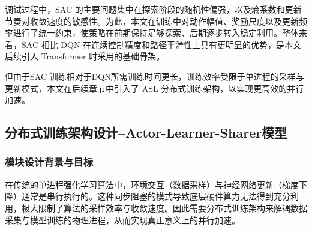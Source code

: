 调试过程中，SAC 的主要问题集中在探索阶段的随机性偏强，以及熵系数和更新节奏对收敛速度的敏感性。为此，本文在训练中对动作幅值、奖励尺度以及更新频率进行了统一约束，使策略在前期保持足够探索、后期逐步转入稳定利用。整体来看，SAC 相比 DQN 在连续控制精度和路径平滑性上具有更明显的优势，是本文后续引入 Transformer 时采用的基础骨架。

但由于SAC 训练相对于DQN所需训练时间更长，训练效率受限于单进程的采样与更新模式，本文在后续章节中引入了 ASL 分布式训练架构，以实现更高效的并行加速。

\subsection{分布式训练架构设计--Actor-Learner-Sharer模型}
\label{sec:shared_data_module}

\subsubsection{模块设计背景与目标}

在传统的单进程强化学习算法中，环境交互（数据采样）与神经网络更新（梯度下降）通常是串行执行的。这种同步阻塞的模式导致底层硬件算力无法得到充分利用，极大限制了算法的采样效率与收敛速度。因此需要分布式训练架构来解耦数据采集与模型训练的物理进程，从而实现真正意义上的并行加速。

